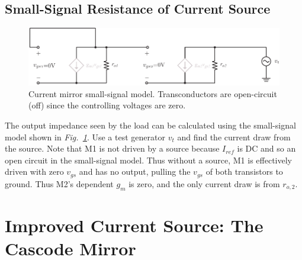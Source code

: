 \subsection{Small-Signal Resistance of Current Source}
\begin{figure}[tb]
\centering
\includegraphics[scale=0.95]{8mirror_small_signal.pdf}
\caption{Current mirror small-signal model.  Transconductors are open-circuit (off) since the controlling voltages are zero.}
\label{fig:8mirror_small_signal.pdf}
\end{figure}
The output impedance seen by the load can be calculated using the small-signal model shown in \emph{Fig.~\ref{fig:8mirror_small_signal.pdf}}.  Use a test generator $v_t$ and find the current draw from the source.  Note that M1 is not driven by a source because $I_{ref}$ is DC and so an open circuit in the small-signal model.  Thus without a source, M1 is effectively driven with zero $v_{gs}$ and has no output, pulling the $v_{gs}$ of both transistors to ground.  Thus M2's dependent $g_m$ is zero, and the only current draw is from $r_{o,2}$.
\section{Improved Current Source:  The Cascode Mirror}
